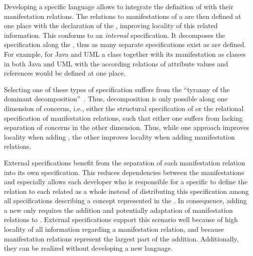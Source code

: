 Developing a specific language allows to integrate the definition of \commonalities with their manifestation relations.
The relations to manifestations of a \commonality are then defined at one place with the declaration of the \commonality, improving locality of this related information.
This conforms to an \emph{internal} specification.
It decomposes the specification along the \commonalities, thus as many separate specifications exist as \commonalities are defined. %
For example, for Java and \gls{UML} a class \commonality together with its manifestation as classes in both Java and \gls{UML} with the according relations of attribute values and references would be defined at one place.

Selecting one of these types of specification suffers from the \enquote{tyranny of the dominant decomposition}~\cite{tarr1999Tyranny-ICSE}.
Thus, decomposition is only possible along one dimension of concerns, i.e., either the structural specification of \commonalities or the relational specification of manifestation relations, such that either one suffers from lacking separation of concerns in the other dimension.
Thus, while one approach improves locality when adding \commonalities, the other improves locality when adding manifestation relations.

External specifications benefit from the separation of each manifestation relation into its own specification.
This reduces dependencies between the manifestations and especially allows each developer who is responsible for a specific \concretemetamodel to define the relation to each related \conceptmetamodel as a whole instead of distributing this specification among all \commonalities specifications describing a concept represented in the \concretemetamodel.
In consequence, adding a new \concretemetamodel only requires the addition and potentially adaptation of manifestation relations to \conceptmetamodels.
External specifications support this scenario well because of high locality of all information regarding a manifestation relation, and because manifestation relations represent the largest part of the addition.
Additionally, they can be realized without developing a new language.

